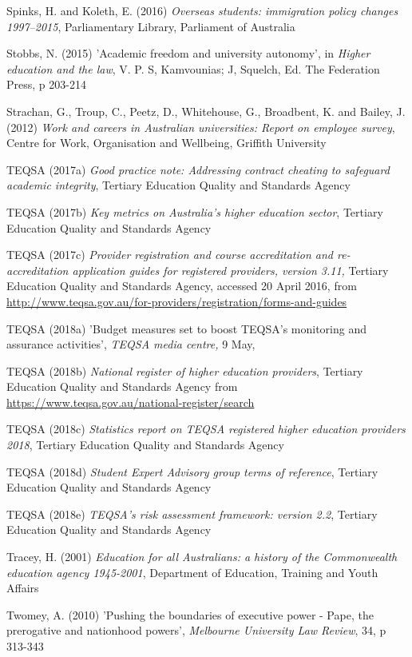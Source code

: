 \documentclass[]{book}
\begin{document}
Spinks, H. and Koleth, E. (2016) \emph{Overseas students: immigration policy changes 1997--2015}, Parliamentary Library, Parliament of Australia

Stobbs, N. (2015) 'Academic freedom and university autonomy', in \emph{Higher education and the law}, V. P. S, Kamvounias; J, Squelch, Ed. The Federation Press, p 203-214

Strachan, G., Troup, C., Peetz, D., Whitehouse, G., Broadbent, K. and Bailey, J. (2012) \emph{Work and careers in Australian universities: Report on employee survey}, Centre for Work, Organisation and Wellbeing, Griffith University

TEQSA (2017a) \emph{Good practice note: Addressing contract cheating to safeguard academic integrity}, Tertiary Education Quality and Standards Agency

TEQSA (2017b) \emph{Key metrics on Australia's higher education sector}, Tertiary Education Quality and Standards Agency

TEQSA (2017c) \emph{Provider registration and course accreditation and re-accreditation application guides for registered providers, version 3.11,} Tertiary Education Quality and Standards Agency, accessed 20 April 2016, from \url{http://www.teqsa.gov.au/for-providers/registration/forms-and-guides}

TEQSA (2018a) 'Budget measures set to boost TEQSA's monitoring and assurance activities', \emph{TEQSA media centre,} 9 May,

\protect\hypertarget{_ENREF_199}{}{}TEQSA (2018b) \emph{National register of higher education providers}, Tertiary Education Quality and Standards Agency from \url{https://www.teqsa.gov.au/national-register/search}

TEQSA (2018c) \emph{Statistics report on TEQSA registered higher education providers 2018}, Tertiary Education Quality and Standards Agency

TEQSA (2018d) \emph{Student Expert Advisory group terms of reference}, Tertiary Education Quality and Standards Agency

TEQSA (2018e) \emph{TEQSA's risk assessment framework: version 2.2}, Tertiary Education Quality and Standards Agency

Tracey, H. (2001) \emph{Education for all Australians: a history of the Commonwealth education agency 1945-2001}, Department of Education, Training and Youth Affairs

Twomey, A. (2010) 'Pushing the boundaries of executive power - Pape, the prerogative and nationhood powers', \emph{Melbourne University Law Review}, 34, p 313-343
\end{document}
